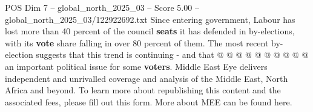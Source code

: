 \begin{textsample}{POS Dim 7 – global\_north\_2025\_03 – Score 5.00 – global\_north\_2025\_03/122922692.txt}
Since entering government, Labour has lost more than 40 percent of the council \textbf{seats} it has defended in by-elections, with its \textbf{vote} share falling in over 80 percent of them.
The most recent by-election suggests that this trend is continuing - and that @ @ @ @ @ @ @ @ @ @ an important political issue for some \textbf{voters}.
Middle East Eye delivers independent and unrivalled coverage and analysis of the Middle East, North Africa and beyond.
To learn more about republishing this content and the associated fees, please fill out this form.
More about MEE can be found here.

\end{textsample}
